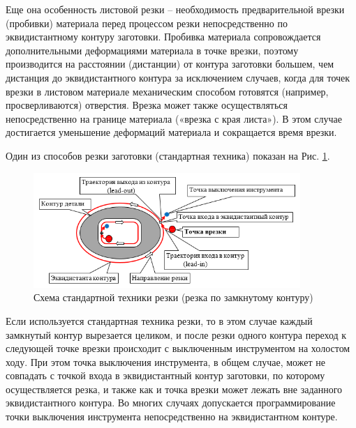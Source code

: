 \documentclass[12pt,twoside]{report}
\begin{document}
Еще она особенность листовой резки –
необходимость предварительной врезки (пробивки)
материала перед процессом резки непосредственно
по эквидистантному контуру заготовки.
Пробивка материала сопровождается дополнительными
деформациями материала в точке врезки,
поэтому производится на расстоянии (дистанции)
от контура заготовки большем,
чем дистанция до эквидистантного контура за исключением случаев,
когда для точек врезки в листовом материале механическим способом
готовятся (например, просверливаются)
отверстия.
Врезка может также осуществляться
непосредственно на границе материала
(«врезка с края листа»).
В этом случае достигается уменьшение
деформаций материала и сокращается время врезки.

Один из способов резки заготовки (стандартная техника)
показан на Рис. \ref{standard-cutting}.

\begin{figure}
  \begin{center}
  \includegraphics[width=0.9\textwidth]{cutting-path.png}
  \caption{Схема стандартной техники резки (резка по замкнутому контуру)}
  \label{standard-cutting}
  \end{center}
\end{figure}

Если используется стандартная техника резки,
то в этом случае каждый замкнутый контур вырезается целиком,
и после резки одного контура переход к следующей точке врезки
происходит с выключенным инструментом на холостом ходу.
При этом точка выключения инструмента, в общем случае,
может не совпадать с точкой входа в эквидистантный контур заготовки,
по которому осуществляется резка, и также как и точка врезки
может лежать вне заданного эквидистантного контура.
Во многих случаях допускается программирование точки выключения
инструмента непосредственно на эквидистантном контуре.
\end{document}
